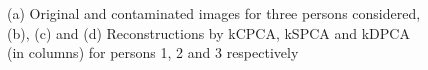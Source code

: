 \documentclass[10pt, conference, compsocconf]{IEEEtran}
\begin{document}
\begin{figure}[htp]
\caption{(a) Original and contaminated images for three persons considered,\\(b), (c) and (d) Reconstructions by kCPCA, kSPCA and kDPCA (in columns) for persons 1, 2 and 3 respectively}
\label{fig:yale1}
\end{figure}
\end{document}

